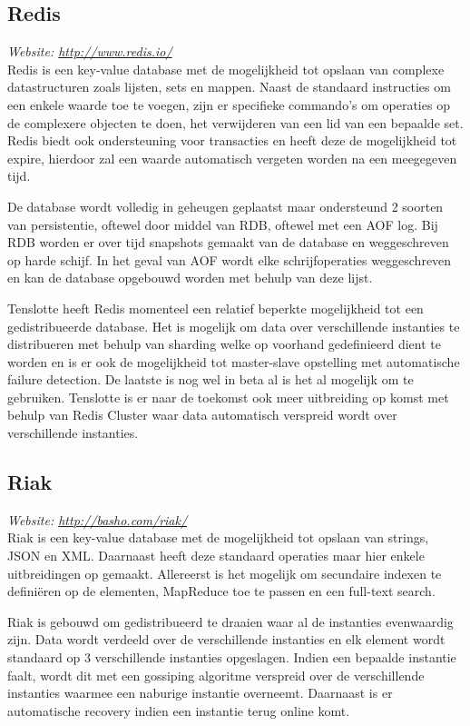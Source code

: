 \subsection{Redis}
\textit{Website: \url{http://www.redis.io/}}\\
Redis is een key-value database met de mogelijkheid tot opslaan van complexe datastructuren zoals lijsten, sets en mappen. Naast de standaard instructies om een enkele waarde toe te voegen, zijn er specifieke commando's om operaties op de complexere objecten te doen, het verwijderen van een lid van een bepaalde set. Redis biedt ook ondersteuning voor transacties en heeft deze de mogelijkheid tot expire, hierdoor zal een waarde automatisch vergeten worden na een meegegeven tijd. 

De database wordt volledig in geheugen geplaatst maar ondersteund 2 soorten van persistentie, oftewel door middel van RDB, oftewel met een AOF log. Bij RDB worden er over tijd snapshots gemaakt van de database en weggeschreven op harde schijf. In het geval van AOF wordt elke schrijfoperaties weggeschreven en kan de database opgebouwd worden met behulp van deze lijst.

Tenslotte heeft Redis momenteel een relatief beperkte mogelijkheid tot een gedistribueerde database. Het is mogelijk om data over verschillende instanties te distribueren met behulp van sharding welke op voorhand gedefinieerd dient te worden en is er ook de mogelijkheid tot master-slave opstelling met automatische failure detection.
De laatste is nog wel in beta al is het al mogelijk om te gebruiken. Tenslotte is er naar de toekomst ook meer uitbreiding op komst met behulp van Redis Cluster waar data automatisch verspreid wordt over verschillende instanties. 

\subsection{Riak}
\textit{Website: \url{http://basho.com/riak/}}\\
Riak is een key-value database met de mogelijkheid tot opslaan van strings, JSON en XML. Daarnaast heeft deze standaard operaties maar hier enkele uitbreidingen op gemaakt. Allereerst is het mogelijk om secundaire indexen te definiëren op de elementen, MapReduce toe te passen en een full-text search. 

Riak is gebouwd om gedistribueerd te draaien waar al de instanties evenwaardig zijn. Data wordt verdeeld over de verschillende instanties en elk element wordt standaard op 3 verschillende instanties opgeslagen. Indien een bepaalde instantie faalt, wordt dit met een gossiping algoritme verspreid over de verschillende instanties waarmee een naburige instantie overneemt. Daarnaast is er automatische recovery indien een instantie terug online komt. 

